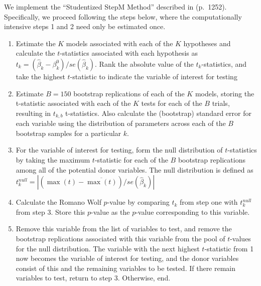 \documentclass[a4paper,11pt]{article}
\begin{document}
\begin{spacing}{1}
We implement the ``Studentized StepM Method'' described in
\citet{RomanoWolf2005b} (p.\ 1252).  Specifically, we proceed
following the steps below, where the computationally intensive steps 1
and 2 need only be estimated once.
\begin{enumerate}
\item Estimate the $K$ models associated with each of the $K$ hypotheses and calculate the $t$-statistics associated with each hypothesis as $t_k=(\widehat\beta_k-\beta_k^{0})/se(\widehat\beta_k)$. Rank the absolute value of the $t_k$-statistics, and take the highest $t$-statistic to indicate the variable of interest for testing
\item Estimate $B=150$ bootstrap replications of each of the $K$ models, storing the t-statistic associated with each of the $K$ tests for each of the $B$ trials, resulting in $t_{k,b}$ t-statistics.  Also calculate the (bootstrap) standard error for each variable using the distribution of parameters across each of the $B$ bootstrap samples for a particular $k$.
\item For the variable of interest for testing, form the null distribution of $t$-statistics by taking the maximum $t$-statistic for each of the $B$ bootstrap replications among all of the potential donor variables.  The null distribution is defined as $t^{null}_{k}=|(\max(t)-\overline{\max(t)})/se(\widehat\beta_k)|$
\item Calculate the Romano Wolf $p$-value by comparing $t_k$ from step one with $t^{null}_k$ from step 3.  Store this $p$-value as the $p$-value corresponding to this variable.
\item Remove this variable from the list of variables to test, and remove the bootstrap replications associated with this variable from the pool of $t$-values for the null distribution.  The variable with the next highest $t$-statistic from 1 now becomes the variable of interest for testing, and the donor variables consist of this and the remaining variables to be tested.  If there remain variables to test, return to step 3.  Otherwise, end.
\end{enumerate}
\end{spacing}
\end{document}
